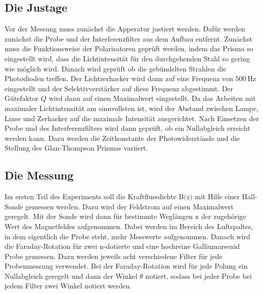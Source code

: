 \subsection{Die Justage}
Vor der Messung muss zunächst die Apperatur justiert werden. Dafür werden
zunächst die Probe und der Interferenzfilter aus dem Aufbau entfernt. Zunächst
muss die Funktionsweise der Polarisatoren geprüft werden, indem das Prisma so
eingestellt wird, dass die Lichtintensität für den durchgehenden Stahl
so gering wie möglich wird. Danach wird geprüft ob die gebündelten Strahlen
die Photodioden treffen. Der Lichtzerhacker wird dann auf eine Frequenz von
$\SI{500}{\hertz}$ eingestellt und der Selektivverstärker auf diese Frequenz
abgestimmt. Der Gütefaktor $Q$ wird dann auf einen Maximalwert eingestellt.
Da das Arbeiten mit maximaler Lichtintensität am sinnvollsten ist, wird der
Abstand zwischen Lampe, Linse und Zerhacker auf die maximale Intensität
ausgerichtet. Nach Einsetzen der Probe und des Interferenzfilters wird dann
geprüft, ob ein Nullabgleich erreicht werden kann. Dazu werden die Zeitkonstante
der Photowiderstände und die Stellung des Glan-Thompson Prismas variiert.

\subsection{Die Messung}
Im ersten Teil des Experiments soll die Kraftflussdichte $\text{B(z)}$ mit
Hilfe einer Hall-Sonde gemessen werden. Dazu wird der Feldstrom auf einen
Maximalwert geregelt. Mit der Sonde wird dann für bestimmte Weglängen $\text{x}$
der zugehörige Wert des Magnetfeldes aufgenommen. Dabei werden im Bereich des
Luftspaltes, in dem eigentlich die Probe steht, mehr Messwerte aufgenommen.
Danach wird die Faraday-Rotation für zwei n-dotierte und eine hochreine
Galliumarsenid Probe gemessen. Dazu werden jeweils acht verschiedene Filter
für jede Probenmessung verwendet. Bei der Faraday-Rotation wird für jede
Polung ein Nullabgleich geregelt und dann der Winkel $\theta$ notiert, sodass
bei jeder Probe bei jedem Filter zwei Winkel notiert werden.
